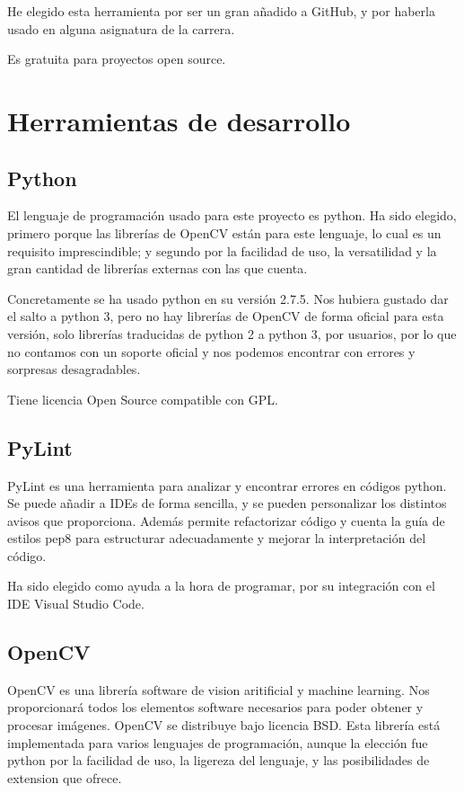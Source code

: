 He elegido esta herramienta por ser un gran añadido a GitHub, y por haberla usado en alguna asignatura de la carrera.  

Es gratuita para proyectos open source.


\section{Herramientas de desarrollo}

\subsection{Python}
El lenguaje de programación usado para este proyecto es python. Ha sido elegido, primero porque las librerías de OpenCV están para este lenguaje, lo cual es un requisito imprescindible; y segundo por la facilidad de uso, la versatilidad y la gran cantidad de librerías externas con las que cuenta.

Concretamente se ha usado python en su versión 2.7.5.
Nos hubiera gustado dar el salto a python 3, pero no hay librerías de OpenCV de forma oficial para esta versión, solo librerías traducidas de python 2 a python 3, por usuarios, por lo que no contamos con un soporte oficial y nos podemos encontrar con errores y sorpresas desagradables.

Tiene licencia Open Source compatible con GPL.

\subsection{PyLint}
PyLint es una herramienta para analizar y encontrar errores en códigos python. Se puede añadir a IDEs de forma sencilla, y se pueden personalizar los distintos avisos que proporciona. 
Además permite refactorizar código y cuenta la guía de estilos pep8\cite{pep8} para estructurar adecuadamente y mejorar la interpretación del código.

Ha sido elegido como ayuda a la hora de programar, por su integración con el IDE Visual Studio Code.

\subsection{OpenCV}
OpenCV es una librería software de vision aritificial y machine learning. Nos proporcionará todos los elementos software necesarios para poder obtener y procesar imágenes. 
OpenCV se distribuye bajo licencia BSD. 
Esta librería está implementada para varios lenguajes de programación, aunque la elección fue python por la facilidad de uso, la ligereza del lenguaje, y las posibilidades de extension que ofrece.

